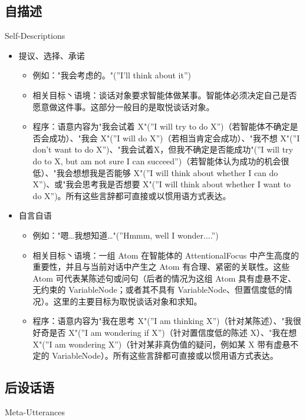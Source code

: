 \subsection{自描述}{Self-Descriptions}

\begin{itemize}

\item 提议、选择、承诺
\begin{itemize}
\item 例如："我会考虑的。"(”I’ll think about it”)
\item 相关目标丶语境：谈话对象要求智能体做某事。智能体必须决定自己是否愿意做这件事。这部分一般目的是取悦谈话对象。
\item 程序：语意内容为"我会试着 X"(”I will try to do X”)（若智能体不确定是否会成功）、"我会 X"(”I will do X”)（若相当肯定会成功）、"我不想 X"(”I don’t want to do X”)、"我会试着X，但我不确定是否能成功"(”I will try do to X, but am not sure I can succeed”)（若智能体认为成功的机会很低）、"我会想想我是否能够 X"(”I will think about whether I can do X”)、或"我会思考我是否想要 X"(”I will think about whether I want to do X”)。所有这些言辞都可直接或以惯用语方式表达。
\end{itemize}


\item 自言自语
\begin{itemize}
\item 例如："嗯…我想知道…"(”Hmmm, well I wonder....”)
\item 相关目标丶语境：一组 Atom 在智能体的 AttentionalFocus 中产生高度的重要性，并且与当前对话中产生之 Atom 有合理、紧密的关联性。这些 Atom 可代表某陈述句或问句（后者的情况为这组 Atom 具有虚悬不定、无约束的 VariableNode；或者其不具有 VariableNode、但置信度低的情况）。这里的主要目标为取悦谈话对象和求知。 
\item 程序：语意内容为"我在思考 X"(”I am thinking X”)（针对某陈述）、"我很好奇是否 X"(”I am wondering if X”)（针对置信度低的陈述 X）、"我在想 X"(”I am wondering X”)（针对某非真伪值的疑问，例如某 X 带有虚悬不定的 VariableNode）。所有这些言辞都可直接或以惯用语方式表达。
\end{itemize}

\end{itemize}

\subsection{后设话语}{Meta-Utterances}

